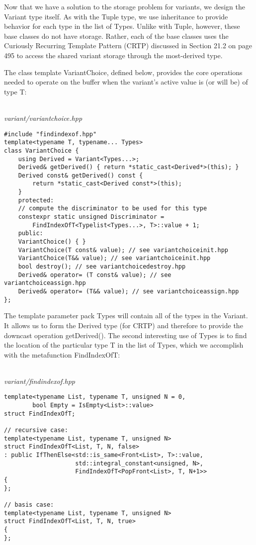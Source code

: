 
Now that we have a solution to the storage problem for variants, we design the Variant type itself. As with the Tuple type, we use inheritance to provide behavior for each type in the list of Types. Unlike with Tuple, however, these base classes do not have storage. Rather, each of the base classes uses the Curiously Recurring Template Pattern (CRTP) discussed in Section 21.2 on page 495 to access the shared variant storage through the most-derived type.

The class template VariantChoice, defined below, provides the core operations needed to operate on the buffer when the variant’s active value is (or will be) of type T:

\hspace*{\fill} \\ %
\noindent
\textit{variant/variantchoice.hpp}
\begin{lstlisting}[style=styleCXX]
#include "findindexof.hpp"
template<typename T, typename... Types>
class VariantChoice {
	using Derived = Variant<Types...>;
	Derived& getDerived() { return *static_cast<Derived*>(this); }
	Derived const& getDerived() const {
		return *static_cast<Derived const*>(this);
	}
	protected:
	// compute the discriminator to be used for this type
	constexpr static unsigned Discriminator =
		FindIndexOfT<Typelist<Types...>, T>::value + 1;
	public:
	VariantChoice() { }
	VariantChoice(T const& value); // see variantchoiceinit.hpp
	VariantChoice(T&& value); // see variantchoiceinit.hpp
	bool destroy(); // see variantchoicedestroy.hpp
	Derived& operator= (T const& value); // see variantchoiceassign.hpp
	Derived& operator= (T&& value); // see variantchoiceassign.hpp
};
\end{lstlisting}

The template parameter pack Types will contain all of the types in the Variant. It allows us to form the Derived type (for CRTP) and therefore to provide the downcast operation getDerived(). The second interesting use of Types is to find the location of the particular type T in the list of Types, which we accomplish with the metafunction FindIndexOfT:

\hspace*{\fill} \\ %
\noindent
\textit{variant/findindexof.hpp}
\begin{lstlisting}[style=styleCXX]
template<typename List, typename T, unsigned N = 0,
		bool Empty = IsEmpty<List>::value>
struct FindIndexOfT;

// recursive case:
template<typename List, typename T, unsigned N>
struct FindIndexOfT<List, T, N, false>
: public IfThenElse<std::is_same<Front<List>, T>::value,
					std::integral_constant<unsigned, N>,
					FindIndexOfT<PopFront<List>, T, N+1>>
{
};

// basis case:
template<typename List, typename T, unsigned N>
struct FindIndexOfT<List, T, N, true>
{
};
\end{lstlisting}

